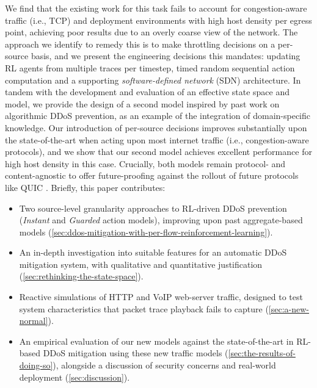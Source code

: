 \documentclass[10pt, times, comsoc]{IEEEtran}
\begin{document}
We find that the existing work for this task fails to account for congestion-aware traffic (i.e., TCP) and deployment environments with high host density per egress point, achieving poor results due to an overly coarse view of the network.
The approach we identify to remedy this is to make throttling decisions on a per-source basis, and we present the engineering decisions this mandates: updating RL agents from multiple traces per timestep, timed random sequential action computation and a supporting \emph{software-defined network} (SDN) architecture.
In tandem with the development and evaluation of an effective state space and model, we provide the design of a second model inspired by past work on algorithmic DDoS prevention, as an example of the integration of domain-specific knowledge.
Our introduction of per-source decisions improves substantially upon the state-of-the-art when acting upon most internet traffic (i.e., congestion-aware protocols), and we show that our second model achieves excellent performance for high host density in this case.
Crucially, both models remain protocol- and content-agnostic to offer future-proofing against the rollout of future protocols like QUIC \cite{DBLP:conf/sigcomm/LangleyRWVKZYKS17}.
Briefly, this paper contributes:
\begin{itemize}
	\item Two source-level granularity approaches to RL-driven DDoS prevention (\emph{Instant} and \emph{Guarded} action models), improving upon past aggregate-based models (\cref{sec:ddos-mitigation-with-per-flow-reinforcement-learning}).
	\item An in-depth investigation into suitable features for an automatic DDoS mitigation system, with qualitative and quantitative justification (\cref{sec:rethinking-the-state-space}).
	\item Reactive simulations of HTTP and VoIP web-server traffic, designed to test system characteristics that packet trace playback fails to capture (\cref{sec:a-new-normal}).
	\item An empirical evaluation of our new models against the state-of-the-art in RL-based DDoS mitigation using these new traffic models (\cref{sec:the-results-of-doing-so}), alongside a discussion of security concerns and real-world deployment (\cref{sec:discussion}).
\end{itemize}
\end{document}
